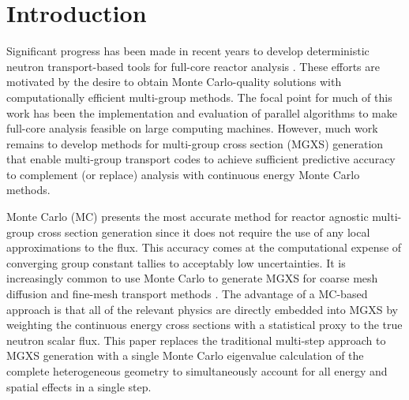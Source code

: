 \section{Introduction}
\label{sec:intro}

Significant progress has been made in recent years to develop deterministic neutron transport-based tools for full-core reactor analysis \citep{gunow20173dmoc, ryu2015solution, kochunas2013overview, evans2010denovo, palmiotti2007unic}. These efforts are motivated by the desire to obtain Monte Carlo-quality solutions with computationally efficient multi-group methods. The focal point for much of this work has been the implementation and evaluation of parallel algorithms to make full-core analysis feasible on large computing machines. However, much work remains to develop methods for multi-group cross section (MGXS) generation that enable multi-group transport codes to achieve sufficient predictive accuracy to complement (or replace) analysis with continuous energy Monte Carlo methods.

Monte Carlo (MC) presents the most accurate method for reactor agnostic multi-group cross section generation since it does not require the use of any local approximations to the flux. This accuracy comes at the computational expense of converging group constant tallies to acceptably low uncertainties. It is increasingly common to use Monte Carlo to generate MGXS for coarse mesh diffusion \citep{serpent2013manual} and fine-mesh transport methods \citep{redmond1997multigroup, nelson2014improved, cai2014condensation}. The advantage of a MC-based approach is that all of the relevant physics are directly embedded into MGXS by weighting the continuous energy cross sections with a statistical proxy to the true neutron scalar flux. This paper replaces the traditional multi-step approach to MGXS generation with a single Monte Carlo eigenvalue calculation of the complete heterogeneous geometry to simultaneously account for all energy and spatial effects in a single step.




